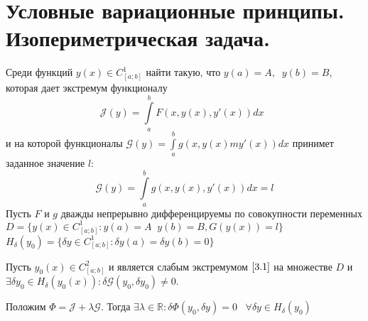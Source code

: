 \documentclass{article}
\begin{document}
\section{Условные вариационные принципы. Изопериметрическая задача.}
Среди функций $y(x)\in C^1_{[a;b]}$ найти такую, что $y(a)=A,\;\; y(b)=B$, которая дает экстремум функционалу \begin{equation}
    \mathcal{J}(y)=\int\limits_a^b F(x,y(x),y'(x))dx\;\;\label{3.1}\tag{3.1}
\end{equation} 
и на которой функционалы $\mathcal{G}(y) = \int\limits_a^b g(x,y(x)my'(x))dx$ принимет заданное значение $l$:
\begin{equation}
    \tag{3.2}
    \label{3.2}
    \mathcal{G}(y)=\int\limits_a^b g(x,y(x),y'(x))d x=l
\end{equation}
Пусть $F$ и $g$ дважды непрерывно дифференцируемы по совокупности переменных $D=\{y(x)\in C^1_{[a;b]}:y(a)=A\;\;y(b)=B, G(y(x))=l\}$
$H_\delta (y_0)=\{\delta y \in C^1_{[a;b]}:\delta y (a) = \delta  y(b)=0\}$
\begin{theorem}
Пусть $y_0(x)\in C^2_{[a;b]}$ и является слабым экстремумом $\ref{3.1}$ на множестве $D$ и $\exists \delta y_0\in H_\delta (y_0(x)): \delta \mathcal{G}(y_0,\delta y_0)\neq 0.$\par
Положим $\Phi =\mathcal{J}+\lambda\mathcal{G}.$ Тогда $\exists \lambda \in \mathds{R}: \delta \Phi(y_0,\delta y)=0\;\;\;\forall \delta y\in H_\delta(y_0)$
\end{theorem}
\end{document}
